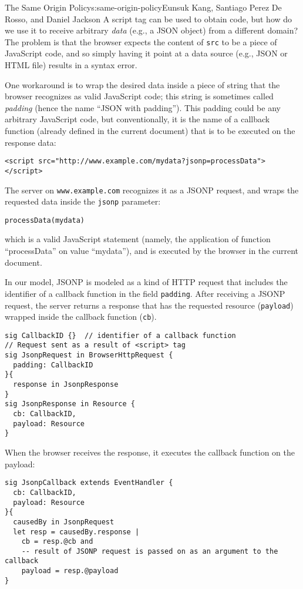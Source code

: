 \begin{aosachapter}{The Same Origin Policy}{s:same-origin-policy}{Eunsuk Kang, Santiago Perez De Rosso, and Daniel Jackson}
A script tag can be used to obtain code, but how do we use it to receive
arbitrary \emph{data} (e.g., a JSON object) from a different domain? The
problem is that the browser expects the content of \texttt{src} to be a
piece of JavaScript code, and so simply having it point at a data source
(e.g., JSON or HTML file) results in a syntax error.

One workaround is to wrap the desired data inside a piece of string that
the browser recognizes as valid JavaScript code; this string is
sometimes called \emph{padding} (hence the name ``JSON with padding'').
This padding could be any arbitrary JavaScript code, but conventionally,
it is the name of a callback function (already defined in the current
document) that is to be executed on the response data:

\begin{verbatim}
<script src="http://www.example.com/mydata?jsonp=processData"></script>
\end{verbatim}

The server on \texttt{www.example.com} recognizes it as a JSONP request,
and wraps the requested data inside the \texttt{jsonp} parameter:

\begin{verbatim}
processData(mydata)
\end{verbatim}

which is a valid JavaScript statement (namely, the application of
function ``processData'' on value ``mydata''), and is executed by the
browser in the current document.

In our model, JSONP is modeled as a kind of HTTP request that includes
the identifier of a callback function in the field \texttt{padding}.
After receiving a JSONP request, the server returns a response that has
the requested resource (\texttt{payload}) wrapped inside the callback
function (\texttt{cb}).

\begin{verbatim}
sig CallbackID {}  // identifier of a callback function
// Request sent as a result of <script> tag
sig JsonpRequest in BrowserHttpRequest {
  padding: CallbackID
}{
  response in JsonpResponse
}
sig JsonpResponse in Resource {
  cb: CallbackID,
  payload: Resource
}
\end{verbatim}

When the browser receives the response, it executes the callback
function on the payload:

\begin{verbatim}
sig JsonpCallback extends EventHandler {
  cb: CallbackID,
  payload: Resource
}{
  causedBy in JsonpRequest
  let resp = causedBy.response | 
    cb = resp.@cb and
    -- result of JSONP request is passed on as an argument to the callback
    payload = resp.@payload
}
\end{verbatim}


\end{aosachapter}
